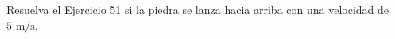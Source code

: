 \item Resuelva el Ejercicio 51 si la piedra se lanza hacia arriba con una velocidad de $5 \text{ m/s}$.
